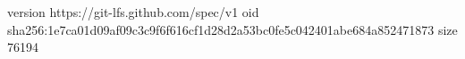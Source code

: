 version https://git-lfs.github.com/spec/v1
oid sha256:1e7ca01d09af09c3c9f6f616cf1d28d2a53bc0fe5c042401abe684a852471873
size 76194
